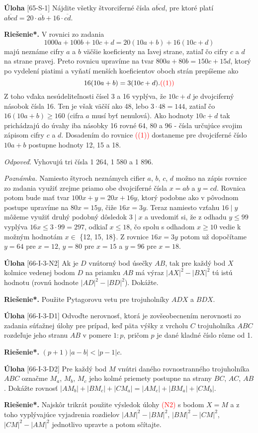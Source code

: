 \documentclass{article}
\newcommand{\rieh}{\textbf{Riešenie*.} }
\newcommand\todo[1]{\noindent\textcolor{red}{(#1)}}
\newcommand{\problem}[4]{
  \begin{tcolorbox}[breakable,notitle,boxrule=0pt,colback=light-gray,colframe=light-gray]
    \textbf{Úloha}
    [#1] #3
  \end{tcolorbox}
  \noindent#4
}
\begin{document}
\problem{65-S-1}{}{
 Nájdite všetky štvorciferné čísla $\overline{abcd}$, pre ktoré platí $\overline{abcd} = 20 \cdot \overline{ab} + 16 \cdot \overline{cd}$.
}{
\rieh V rovnici zo zadania
$$1 000a + 100b + 10c + d = 20(10a + b) + 16(10c + d)$$
majú neznáme cifry $a$ a $b$ väčšie koeficienty na ľavej strane, zatiaľ čo cifry $c$ a $d$ na strane pravej. Preto rovnicu upravíme na tvar $800a + 80b = 150c + 15d$, ktorý po vydelení piatimi a vyňatí menších koeficientov oboch strán prepíšeme ako
$$16(10a + b) = 3(10c + d). \todo{(1)}$$
Z toho vďaka nesúdeliteľnosti čísel 3 a 16 vyplýva, že $10c + d$ je dvojciferný násobok čísla 16. Ten je však väčší ako 48, lebo $3 \cdot 48 = 144$, zatiaľ čo $16(10a + b) \geq 160$ (cifra $a$ musí byť nenulová). Ako hodnoty $10c + d$ tak prichádzajú do úvahy iba násobky 16 rovné 64, 80 a 96 - čísla určujúce svojim zápisom cifry $c$ a $d$. Dosadením do rovnice \todo{(1)} dostaneme pre dvojciferné číslo $10a + b$ postupne hodnoty 12, 15 a 18.

\textit{Odpoveď.} Vyhovujú tri čísla 1 264, 1 580 a 1 896.

\textit{Poznámka.} Namiesto štyroch neznámych cifier $a$, $b$, $c$, $d$ možno na zápis rovnice zo zadania využiť zrejme priamo obe dvojciferné čísla $x = ab$ a $y = cd$. Rovnica potom bude mať tvar $100x+y = 20x+16y$, ktorý podobne ako v pôvodnom postupe upravíme na $80x = 15y$, čiže $16x = 3y$. Teraz namiesto vzťahu $16 \mid y$ môžeme využiť druhý podobný dôsledok $3 \mid x$ a uvedomiť si, že z odhadu $y \leq 99$  vyplýva $16x \leq 3 \cdot 99 = 297$, odkiaľ $x \leq 18$, čo spolu s odhadom $x \geq 10$ vedie k možným hodnotám $x \in$ \{12, 15, 18\}. Z rovnice $16x = 3y$ potom už dopočítame $y = 64$ pre $x = 12$, $y = 80$ pre $x = 15$ a  $y = 96$ pre $x = 18$.
}



\problem{66-I-3-N2}{}{
Ak je $D$ vnútorný bod úsečky $AB$, tak pre každý bod $X$ kolmice vedenej bodom $D$ na priamku $AB$ má výraz $|AX|^2-|BX|^2$ tú istú hodnotu (rovnú hodnote $|AD|^2 -|BD|^2$). Dokážte.
}{
\rieh Použite Pytagorovu vetu pre trojuholníky $ADX$ a $BDX$.
}

\problem{66-I-3-D1}{}{
Odvoďte nerovnosť, ktorá je zovšeobecnením nerovnosti zo zadania súťažnej úlohy pre prípad, keď päta výšky z vrcholu $C$ trojuholníka $ABC$ rozdeľuje jeho stranu $AB$ v pomere $1 : p$, pričom $p$ je dané kladné číslo rôzne od 1.
}{
\rieh $(p + 1)|a - b| < |p - 1|c.$
}


\problem{66-I-3-D2}{}{
Pre každý bod $M$ vnútri daného rovnostranného trojuholníka $ABC$ označme $M_a$, $M_b$, $M_c$ jeho kolmé priemety postupne na strany $BC$, $AC$, $AB$. Dokážte rovnosť $|AM_b|+ |BM_c| + |CM_a| = |AM_c| + |BM_a| + |CM_b|$.
}{
\rieh Najskôr trikrát použite výsledok úlohy \todo{N2} s bodom $X = M$ a z toho vyplývajúce vyjadrenia rozdielov $|AM|^2 - |BM|^2$, $|BM|^2- |CM|^2$, $|CM|^2 -|AM|^2$ jednotlivo upravte a potom sčítajte.
}
\end{document}
